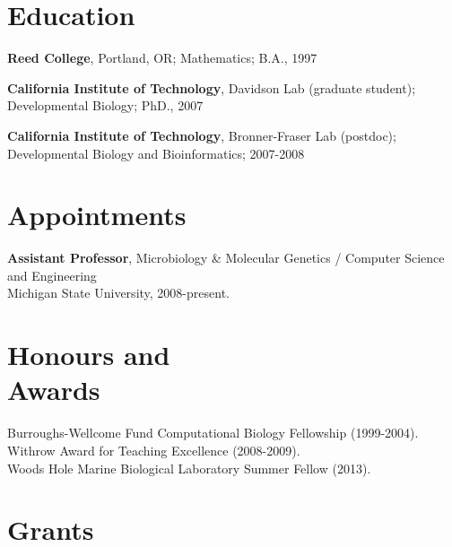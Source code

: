 \documentclass[margin,line]{resume}
\begin{document}


\begin{resume}



    \section{\mysidestyle Education}

    {\bf Reed College}, Portland, OR; Mathematics; B.A., 1997

    \vspace{2mm}

    {\bf California Institute of Technology}, Davidson Lab (graduate student);
\\
Developmental Biology; PhD., 2007

    \vspace{2mm}

    {\bf California Institute of Technology}, Bronner-Fraser Lab (postdoc);\\
 Developmental Biology and Bioinformatics; 2007-2008

    \vspace{2mm}

    \section{\mysidestyle Appointments}

    {\bf Assistant Professor}, 
Microbiology \& Molecular Genetics / Computer Science and Engineering\\
Michigan State University, 2008-present.

    \section{\mysidestyle Honours and\\Awards} 

Burroughs-Wellcome Fund Computational Biology Fellowship (1999-2004).\\
Withrow Award for Teaching Excellence (2008-2009). \\
Woods Hole Marine Biological Laboratory Summer Fellow (2013).

    \section{\mysidestyle Grants}


\end{resume}
\end{document}
